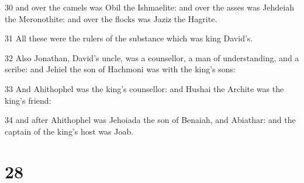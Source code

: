 \par 30 and over the camels was Obil the Ishmaelite: and over the asses was Jehdeiah the Meronothite: and over the flocks was Jaziz the Hagrite.
\par 31 All these were the rulers of the substance which was king David's.
\par 32 Also Jonathan, David's uncle, was a counsellor, a man of understanding, and a scribe: and Jehiel the son of Hachmoni was with the king's sons:
\par 33 And Ahithophel was the king's counsellor: and Hushai the Archite was the king's friend:
\par 34 and after Ahithophel was Jehoiada the son of Benaiah, and Abiathar: and the captain of the king's host was Joab.

\chapter{28}

